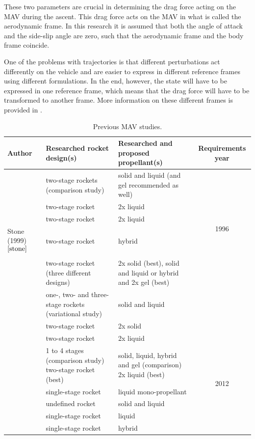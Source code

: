 These two parameters are crucial in determining the drag force acting on the \ac{MAV} during the ascent. This drag force acts on the \ac{MAV} in what is called the aerodynamic frame. In this research it is assumed that both the angle of attack and the side-slip angle are zero, such that the aerodynamic frame and the body frame coincide.

One of the problems with trajectories is that different perturbations act differently on the vehicle and are easier to express in different reference frames using different formulations. In the end, however, the state will have to be expressed in one reference frame, which means that the drag force will have to be transformed to another frame. More information on these different frames is provided in .

\begin{table}[H]
\begin{center}
\caption{Previous \ac{MAV} studies.}
\label{tab:refmavstud}
\begin{tabularx}{1.0\textwidth}{|X|X|X|c|}
\hline 
\textbf{Author} 		 &\textbf{Researched rocket design(s)} & \textbf{Researched and proposed propellant(s)} & \textbf{Requirements year} \\ \hline \hline
\cite{whitehead1997} 		& two-stage rockets (comparison study)  & solid and liquid (and gel recommended as well) & \multirow{5}{*}{1996} \\ \cline{1-3}
\cite{guernsey1998} 		& two-stage rocket & 2x liquid &  \\ \cline{1-3}
\cite{desai1998} 	& two-stage rocket & 2x liquid  & \\ \cline{1-3}
Stone (1999)$^{\ref{stone}}$  & two-stage rocket & hybrid & \\ \hline \hline
\cite{stephenson2002} 		& two-stage rocket (three different designs) & 2x solid (best), solid and liquid or hybrid and 2x gel (best)  & \multirow{8}{*}{2000} \\ \cline{1-3}
\cite{whitehead2005} 		& one-, two- and three-stage rockets (variational study)  & solid and liquid  & \\ \cline{1-3}
\cite{stephenson2006} & two-stage rocket & 2x solid & \\ \hline \hline
\cite{sengupta2012} 		& two-stage rocket & 2x liquid  & \multirow{7}{*}{2012} \\ \cline{1-3}
\cite{trinidad2012} 		& 1 to 4 stages (comparison study) two-stage rocket (best)  & solid, liquid, hybrid and gel (comparison) 2x liquid (best) & \\ \cline{1-3}
\cite{mungas2012}	& single-stage rocket & liquid mono-propellant  &  \\ \cline{1-3}
\cite{mppg2012}	 & undefined rocket & solid and liquid & \\ \hline \hline
\cite{vaughan2016technology} & single-stage rocket & liquid & \multirow{2}{*}{2014} \\ \cline{1-3}
\cite{karp2016technology} & single-stage rocket & hybrid & \\ \hline
 		

\end{tabularx}
\end{center}
\end{table}
